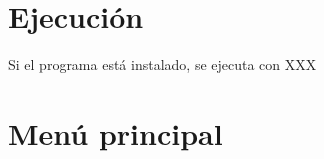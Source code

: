 



\section{Ejecución}


Si el programa está instalado, se ejecuta con XXX

\section{Menú principal}


